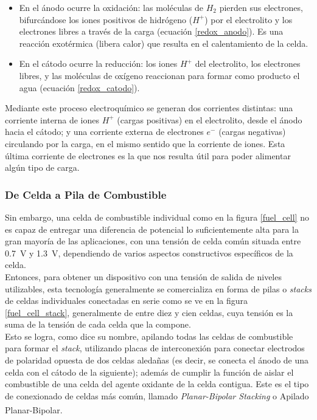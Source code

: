 \begin{itemize}
    \item {\SemiBold En el ánodo ocurre la oxidación:} las moléculas de $H_2$ pierden sus electrones, bifurcándose los iones positivos de hidrógeno ($H^{+}$) por el electrolito y los electrones libres a través de la carga (ecuación \ref{redox_anodo}). Es una reacción exotérmica (libera calor) que resulta en el calentamiento de la celda.
    \item {\SemiBold En el cátodo ocurre la reducción:} los iones $H^{+}$ del electrolito, los electrones libres, y las moléculas de oxígeno reaccionan para formar como producto el agua (ecuación \ref{redox_catodo}).
\end{itemize}

Mediante este proceso electroquímico se generan dos corrientes distintas: una corriente interna de iones $H^{+}$ (cargas positivas) en el electrolito, desde el ánodo hacia el cátodo; y una corriente externa de electrones $e^-$ (cargas negativas) circulando por la carga, en el mismo sentido que la corriente de iones. Esta última corriente de electrones es la que nos resulta útil para poder alimentar algún tipo de carga.\\

\subsubsection{De Celda a Pila de Combustible}

Sin embargo, una celda de combustible individual como en la figura \ref{fuel_cell} no es capaz de entregar una diferencia de potencial lo suficientemente alta para la gran mayoría de las aplicaciones, con una tensión de celda común situada entre \SI{0.7}{\volt} y \SI{1.3}{\volt}, dependiendo de varios aspectos constructivos específicos de la celda.\\

Entonces, para obtener un dispositivo con una tensión de salida de niveles utilizables, esta tecnología generalmente se comercializa en forma de pilas o \textit{stacks} de celdas individuales conectadas en serie como se ve en la figura \ref{fuel_cell_stack}, generalmente de entre diez y cien celdas, cuya tensión es la suma de la tensión de cada celda que la compone.\\

Esto se logra, como dice su nombre, apilando todas las celdas de combustible para formar el \textit{stack}, utilizando placas de interconexión para conectar electrodos de polaridad opuesta de dos celdas aledañas (es decir, se conecta el ánodo de una celda con el cátodo de la siguiente); además de cumplir la función de aislar el combustible de una celda del agente oxidante de la celda contigua. Este es el tipo de conexionado de celdas más común, llamado \textit{Planar-Bipolar Stacking} o Apilado Planar-Bipolar.\textsuperscript{\cite{FCHandbook}}\\

